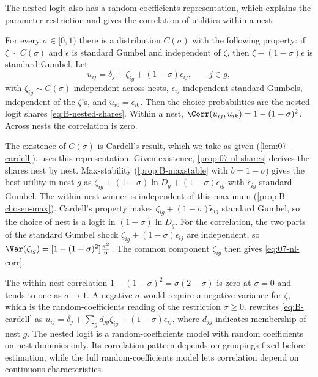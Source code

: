 The nested logit also has a random-coefficients representation, which explains the parameter
restriction and gives the correlation of utilities within a nest.

\begin{proposition}\label{prop:B-cardell}
For every $\sigma \in [0, 1)$ there is a distribution $C(\sigma)$ with the following property: if $\zeta \sim C(\sigma)$
and $\epsilon$ is standard Gumbel and independent of $\zeta$, then $\zeta + (1 - \sigma)\epsilon$ is standard Gumbel. Let
\begin{equation}\label{eq:B-cardell}
u_{ij} = \delta_j + \zeta_{ig} + (1 - \sigma)\epsilon_{ij}, \qquad j \in g,
\end{equation}
with $\zeta_{ig} \sim C(\sigma)$ independent across nests, $\epsilon_{ij}$ independent standard Gumbels, independent of the
$\zeta$'s, and $u_{i0} = \epsilon_{i0}$. Then the choice probabilities are the nested logit shares
\eqref{eq:B-nested-shares}. Within a nest, $\Corr(u_{ij}, u_{ik}) = 1 - (1 - \sigma)^2$. Across nests the correlation is
zero.
\end{proposition}

The existence of $C(\sigma)$ is Cardell's result, which we take as given (\cref{lem:07-cardell}).
\citet[eq.~22, p.~252]{Berry1994} uses this representation. Given existence, \cref{prop:07-nl-shares} derives
the shares nest by nest. Max-stability (\cref{prop:B-maxstable} with $b = 1 - \sigma$) gives the best utility in
nest $g$ as $\zeta_{ig} + (1 - \sigma)\ln D_g + (1 - \sigma)\tilde\epsilon_{ig}$ with $\tilde\epsilon_{ig}$ standard Gumbel.
The within-nest winner is independent of this maximum (\cref{prop:B-chosen-max}). Cardell's property makes
$\zeta_{ig} + (1 - \sigma)\tilde\epsilon_{ig}$ standard Gumbel, so the choice of nest is a logit in
$(1 - \sigma)\ln D_g$. For the correlation, the two parts of the standard Gumbel shock
$\zeta_{ig} + (1 - \sigma)\epsilon_{ij}$ are independent, so $\Var(\zeta_{ig}) = [1 - (1 - \sigma)^2]\frac{\pi^2}{6}$. The
common component $\zeta_{ig}$ then gives \eqref{eq:07-nl-corr}.

The within-nest correlation $1 - (1 - \sigma)^2 = \sigma(2 - \sigma)$ is zero at $\sigma = 0$ and tends to one as
$\sigma \to 1$. A negative $\sigma$ would require a negative variance for $\zeta$, which is the random-coefficients
reading of the restriction $\sigma \geq 0$. \citet[pp.~252--253]{Berry1994} rewrites \eqref{eq:B-cardell} as
$u_{ij} = \delta_j + \sum_gd_{jg}\zeta_{ig} + (1 - \sigma)\epsilon_{ij}$, where $d_{jg}$ indicates membership of nest $g$. The
nested logit is a random-coefficients model with random coefficients on nest dummies only. Its correlation
pattern depends on groupings fixed before estimation, while the full random-coefficients model lets
correlation depend on continuous characteristics.

